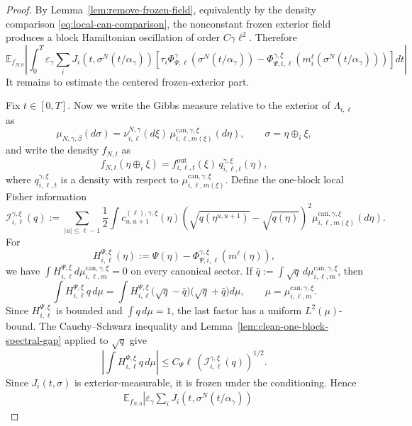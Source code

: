 \documentclass{article}
\begin{document}
\begin{proof}
By Lemma~\ref{lem:remove-frozen-field}, equivalently by the density
comparison \eqref{eq:local-can-comparison}, the nonconstant frozen exterior
field produces a block Hamiltonian oscillation of order \(C\gamma\ell^2\). Therefore 
\begin{equation}\label{eq:frozen-field co}
    \mathbb E_{f_{N,0}} \left| \int_0^T
\varepsilon_\gamma\sum_i
J_i(t,\sigma^N(t/\alpha_\gamma))
\left[ \tau_i \Phi_{\Psi,\ell}^{\gamma}(\sigma^N(t/\alpha_\gamma))
-
\Phi_{\Psi,i,\ell}^{\gamma,\xi}(m_i^\ell(\sigma^N(t/\alpha_\gamma)))
\right]dt \right|
\end{equation}
It remains to estimate the centered frozen-exterior part.

Fix \(t \in [0,T]\). Now we write the Gibbs measure relative to the exterior of
\(\Lambda_{i,\ell}\) as
\[
\mu_{N,\gamma,\beta}(d\sigma)
=
\nu_{i,\ell}^{N,\gamma}(d\xi)\,
\mu_{i,\ell,m(\xi)}^{\mathrm{can},\gamma,\xi}(d\eta),
\qquad
\sigma=\eta\oplus_i\xi,
\]
and write the density \(f_{N,t}\) as
\[
f_{N,t}(\eta\oplus_i\xi)
= f_{i,\ell,t}^{\mathrm{out}}(\xi)\,
q_{i,\ell,t}^{\gamma,\xi}(\eta),
\]
where \(q_{i,\ell,t}^{\gamma,\xi}\) is a density with respect to
\(\mu_{i,\ell,m(\xi)}^{\mathrm{can},\gamma,\xi}\).  Define the one-block local
Fisher information
\[
\mathcal I_{i,\ell}^{\gamma,\xi}(q) :=
\sum_{|u|\le\ell-1}
\frac12
\int
c_{u,u+1}^{(\ell),\gamma,\xi}(\eta)
\left(
\sqrt{q(\eta^{u,u+1})}-\sqrt{q(\eta)}
\right)^2
\mu_{i,\ell,m(\xi)}^{\mathrm{can},\gamma,\xi}(d\eta).
\]
For
\[
H_{i,\ell}^{\Psi,\xi}(\eta) :=
\Psi(\eta) - \Phi_{\Psi,i,\ell}^{\gamma,\xi}(m^\ell(\eta)),
\]
we have \(\int H_{i,\ell}^{\Psi,\xi}d\mu_{i,\ell,m}^{\mathrm{can},\gamma,\xi}=0\)
on every canonical sector.  
If
\(\bar q:=\int\sqrt q\,d\mu_{i,\ell,m}^{\mathrm{can},\gamma,\xi}\), then
\[
\int H_{i,\ell}^{\Psi,\xi}q\,d\mu
=
\int
H_{i,\ell}^{\Psi,\xi}
\bigl(\sqrt q-\bar q\bigr)
\bigl(\sqrt q+\bar q\bigr)d\mu,
\qquad
\mu=\mu_{i,\ell,m}^{\mathrm{can},\gamma,\xi}.
\]
Since \(H_{i,\ell}^{\Psi,\xi}\) is bounded and
\(\int q\,d\mu=1\), the last factor has a uniform \(L^2(\mu)\)-bound.  The
Cauchy--Schwarz inequality and Lemma~\ref{lem:clean-one-block-spectral-gap}
applied to \(\sqrt q\) give
\[
\left|
\int H_{i,\ell}^{\Psi,\xi}q\,d\mu
\right|
\le
C_\Psi\ell\,
\left(\mathcal I_{i,\ell}^{\gamma,\xi}(q)\right)^{1/2}.
\]
Since \(J_i(t,\sigma)\) is exterior-measurable, it is frozen under the conditioning.  Hence
\[
\begin{aligned}
&\mathbb E_{f_{N,0}}
\left|
\varepsilon_\gamma\sum_i
J_i(t,\sigma^N(t/\alpha_\gamma))

\end{aligned}\]
\end{proof}
\end{document}
